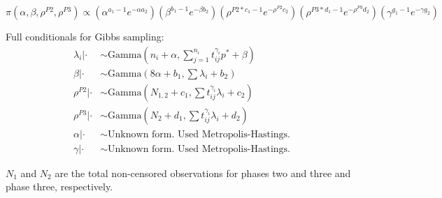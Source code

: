\documentclass[12pt]{article}
\begin{document}
\begin{equation*}
\pi(\alpha, \beta, \rho^{P2}, \rho^{P3}) \propto (\alpha^{a_1-1}e^{-\alpha
  a_2})(\beta^{b_1 - 1}e^{-\beta b_2})(\rho^{P2*c_1 - 1}e^{-\rho^{P2}
  c_2})(\rho^{P3 * d_1 - 1}e^{-\rho^{P3} d_2})(\gamma^{g_1 - 1}e^{-\gamma g_2})
\end{equation*}

Full conditionals for Gibbs sampling:
\begin{align*}
\lambda_i|\cdot &\sim \text{Gamma}(n_i + \alpha, \sum_{j=1}^{n_i}t_{ij}^{\gamma_i} p^* + \beta) \\
\beta|\cdot &\sim \text{Gamma}(8\alpha + b_1, \sum{\lambda_i} + b_2) \\
\rho^{P2}|\cdot &\sim \text{Gamma}(N_{1,2} + c_1, \sum{t_{ij}^{\gamma_i} \lambda_i} + c_2) \\
\rho^{P3}|\cdot &\sim \text{Gamma}(N_{2} + d_1, \sum{t_{ij}^{\gamma_i} \lambda_i} + d_2) \\
\alpha|\cdot &\sim \text{Unknown form.  Used Metropolis-Hastings.}\\
\gamma|\cdot &\sim \text{Unknown form.  Used Metropolis-Hastings.}
\end{align*}

$N_1$ and $N_2$ are the total non-censored observations for phases two and three
and phase three, respectively.
\end{document}
